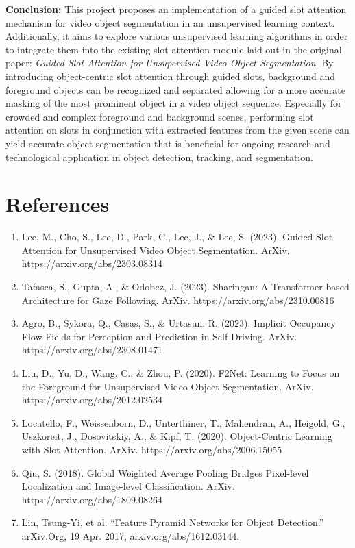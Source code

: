 \documentclass{article}
\theoremstyle{plain}
\theoremstyle{definition}
\theoremstyle{remark}
\begin{document}
\textbf{Conclusion: }
This project proposes an implementation of a guided slot attention mechanism for video object segmentation in an unsupervised learning context. Additionally, it aims to explore various unsupervised learning algorithms in order to integrate them into the existing slot attention module laid out in the original paper: \textit{Guided Slot Attention for Unsupervised Video Object Segmentation}. By introducing object-centric slot attention through guided slots, background and foreground objects can be recognized and separated allowing for a more accurate masking of the most prominent object in a video object sequence.  Especially for crowded and complex foreground and background scenes, performing slot attention on slots in conjunction with extracted features from the given scene can yield accurate object segmentation that is beneficial for ongoing research and technological application in object detection, tracking, and segmentation.

\section*{References}
\renewcommand{\labelenumi}{[\arabic{enumi}]}

\begin{enumerate}
\item Lee, M., Cho, S., Lee, D., Park, C., Lee, J., \& Lee, S. (2023). Guided Slot Attention for Unsupervised Video Object Segmentation. ArXiv. https://arxiv.org/abs/2303.08314

\item Tafasca, S., Gupta, A., \& Odobez, J. (2023). Sharingan: A Transformer-based Architecture for Gaze Following. ArXiv. https://arxiv.org/abs/2310.00816

\item Agro, B., Sykora, Q., Casas, S., \& Urtasun, R. (2023). Implicit Occupancy Flow Fields for Perception and Prediction in Self-Driving. ArXiv. https://arxiv.org/abs/2308.01471

\item Liu, D., Yu, D., Wang, C., \& Zhou, P. (2020). F2Net: Learning to Focus on the Foreground for Unsupervised Video Object Segmentation. ArXiv. https://arxiv.org/abs/2012.02534

\item Locatello, F., Weissenborn, D., Unterthiner, T., Mahendran, A., Heigold, G., Uszkoreit, J., Dosovitskiy, A., \& Kipf, T. (2020). Object-Centric Learning with Slot Attention. ArXiv. https://arxiv.org/abs/2006.15055

\item Qiu, S. (2018). Global Weighted Average Pooling Bridges Pixel-level Localization and Image-level Classification. ArXiv. https://arxiv.org/abs/1809.08264

\item Lin, Tsung-Yi, et al. “Feature Pyramid Networks for Object Detection.” arXiv.Org, 19 Apr. 2017, arxiv.org/abs/1612.03144. 
\end{enumerate}
\end{document}
